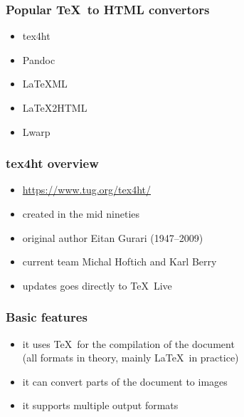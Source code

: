 




\begin{frame}
  \frametitle{Popular \TeX\ to HTML convertors}
  \begin{itemize}
    \item tex4ht
    \item Pandoc
    \item LaTeXML
    \item LaTeX2HTML
    \item Lwarp
  \end{itemize}
\end{frame}



\begin{frame}
  \frametitle{tex4ht overview}
  \begin{itemize}
    \item \url{https://www.tug.org/tex4ht/}
    \item created in the mid nineties
    \item original author Eitan Gurari (1947--2009)
    \item current team Michal Hoftich and Karl Berry 
    \item updates goes directly to \TeX\ Live
  \end{itemize}
\end{frame}

\begin{frame}
  \frametitle{Basic features}
  \begin{itemize}
    \item it uses \TeX\ for the compilation of the document \\(all formats in theory, mainly \LaTeX\ in practice)
    \item it can convert parts of the document to images
    \item it supports multiple output formats
  \end{itemize}

\end{frame}



